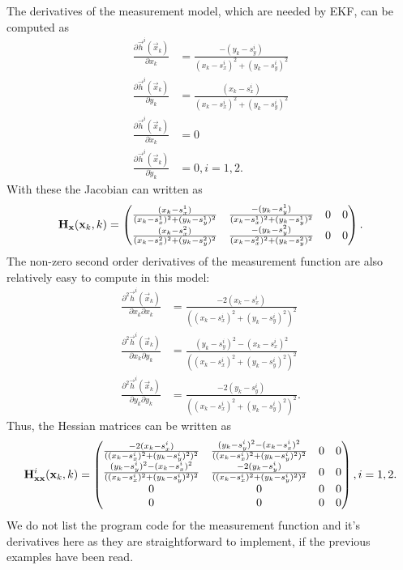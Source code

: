 The derivatives of the measurement model, which are needed by EKF, can
be computed as
%
\begin{equation}
\begin{split} \frac{\partial \vec{h}^i(\vec{x}_k)}{\partial x_k} & =
\frac{-(y_k-s^i_y)}{(x_k-s^i_x)^2+(y_k-s^i_y)^2} \\ \frac{\partial
\vec{h}^i(\vec{x}_k)}{\partial y_k} & =
\frac{(x_k-s^i_x)}{(x_k-s^i_x)^2+(y_k-s^i_y)^2} \\ \frac{\partial
\vec{h}^i(\vec{x}_k)}{\partial \dot{x}_k} & = 0 \\ \frac{\partial
\vec{h}^i(\vec{x}_k)}{\partial \dot{y}_k} & = 0 , i = 1,2.
\end{split}
\label{eq:bot_dx}
\end{equation}
%
With these the Jacobian can written as
%
\begin{equation} \mathbf{H}_{\mathbf{x}}(\mathbf{x}_k,k) = \begin{pmatrix}
\frac{(x_k-s^1_x)}{(x_k-s^1_x)^2+(y_k-s^1_y)^2} &
\frac{-(y_k-s^1_y)}{(x_k-s^1_x)^2+(y_k-s^1_y)^2} & 0 & 0 \\
\frac{(x_k-s^2_x)}{(x_k-s^2_x)^2+(y_k-s^2_y)^2} &
\frac{-(y_k-s^2_y)}{(x_k-s^2_x)^2+(y_k-s^2_y)^2} & 0 & 0
\end{pmatrix}.
\end{equation}
%
The non-zero second order derivatives of the measurement function are
also relatively easy to compute in this model:
%
\begin{equation}
\begin{split} \frac{\partial^2 \vec{h}^i(\vec{x}_k)}{\partial x_k
\partial x_k} & =
\frac{-2(x_k-s^i_x)}{((x_k-s^i_x)^2+(y_k-s^i_y)^2)^2} \\
\frac{\partial^2 \vec{h}^i(\vec{x}_k)}{\partial x_k \partial y_k} & =
\frac{(y_k-s^i_y)^2-(x_k-s^i_x)^2}{((x_k-s^i_x)^2+(y_k-s^i_y)^2)^2} \\
\frac{\partial^2 \vec{h}^i(\vec{x}_k)}{\partial y_k \partial y_k} & =
\frac{-2(y_k-s^i_y)}{((x_k-s^i_x)^2+(y_k-s^i_y)^2)^2}.
\end{split}
\end{equation}
%
Thus, the Hessian matrices can be written as
%
\begin{equation} \mathbf{H}^i_{\mathbf{xx}}(\mathbf{x}_k,k) = \begin{pmatrix}
\frac{-2(x_k-s^i_x)}{((x_k-s^i_x)^2+(y_k-s^i_y)^2)^2} &
\frac{(y_k-s^i_y)^2-(x_k-s^i_x)^2}{((x_k-s^i_x)^2+(y_k-s^i_y)^2)^2} &
0 & 0 \\
\frac{(y_k-s^i_y)^2-(x_k-s^i_x)^2}{((x_k-s^i_x)^2+(y_k-s^i_y)^2)^2} &
\frac{-2(y_k-s^i_y)}{((x_k-s^i_x)^2+(y_k-s^i_y)^2)^2} & 0 & 0 \\ 0 & 0
& 0 & 0 \\ 0 & 0 & 0 & 0
\end{pmatrix}, i=1,2.
\end{equation}
%
We do not list the program code for the measurement function and it's
derivatives here as they are straightforward to implement, if the
previous examples have been read.

